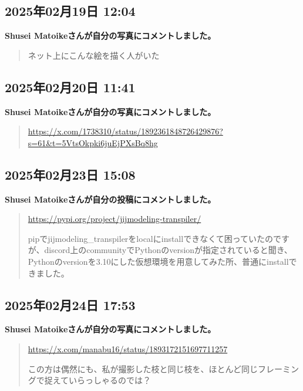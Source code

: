 \subsection*{2025年02月19日 12:04}

\textbf{Shusei Matoikeさんが自分の写真にコメントしました。}

\begin{quote}
ネット上にこんな絵を描く人がいた
\end{quote}

\subsection*{2025年02月20日 11:41}

\textbf{Shusei Matoikeさんが自分の写真にコメントしました。}

\begin{quote}
\url{https://x.com/1738310/status/1892361848726429876?s=61&t=5VtsOkpki6juEjPXsBq8hg}
\end{quote}

\subsection*{2025年02月23日 15:08}

\textbf{Shusei Matoikeさんが自分の投稿にコメントしました。}

\begin{quote}
\url{https://pypi.org/project/jijmodeling-transpiler/}

pipでjijmodeling\_transpilerをlocalにinstallできなくて困っていたのですが、discord上のcommunityでPythonのversionが指定されていると聞き、Pythonのversionを3.10にした仮想環境を用意してみた所、普通にinstallできました。
\end{quote}

\subsection*{2025年02月24日 17:53}

\textbf{Shusei Matoikeさんが自分の写真にコメントしました。}

\begin{quote}
\url{https://x.com/manabu16/status/1893172151697711257}

この方は偶然にも、私が撮影した枝と同じ枝を、ほとんど同じフレーミングで捉えていらっしゃるのでは？
\end{quote}

